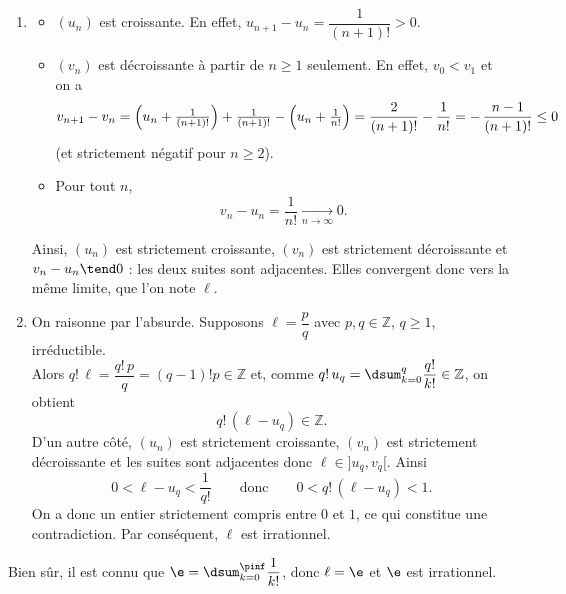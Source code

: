 \begin{enumerate}

\item
\begin{itemize}
\item $(u_n)$ est croissante. En effet, $u_{n+1}-u_n=\dfrac{1}{(n+1)!}>0$.
\item $(v_n)$ est décroissante à partir de $n\ge 1$ seulement. En effet, $v_0<v_1$ et on a
\[
v_{n+1}-v_n
= \Bigl(u_n+\tfrac{1}{(n+1)!}\Bigr) + \tfrac{1}{(n+1)!} - \Bigl(u_n+\tfrac{1}{n!}\Bigr)
= \frac{2}{(n+1)!}-\frac{1}{n!}
= -\,\frac{n-1}{(n+1)!}\le 0
\]
(et strictement négatif pour $n\ge 2$).
\item Pour tout $n$,
\[
v_n-u_n=\frac{1}{n!}\xrightarrow[n\to\infty]{}0.
\]
\end{itemize}
Ainsi, $(u_n)$ est strictement croissante, $(v_n)$ est strictement décroissante et $v_n-u_n\tend0$ :
les deux suites sont adjacentes. Elles convergent donc vers la même limite, que l’on note $\ell$.

\item
On raisonne par l’absurde. Supposons $\ell=\dfrac{p}{q}$ avec $p,q\in\mathbb{Z}$, $q\ge 1$, irréductible.\\
Alors $q!\,\ell=\dfrac{q!\,p}{q}=(q-1)!p\in\mathbb{Z}$
et, comme $q!\,u_q=\dsum_{k=0}^q\dfrac{q!}{k!}\in\mathbb{Z}$, on obtient
\[
q!\,(\ell-u_q)\in\mathbb{Z}.
\]
D’un autre côté, $(u_n)$ est strictement croissante, $(v_n)$ est strictement décroissante et les suites sont adjacentes donc $\ell\in]u_q,v_q[$. Ainsi
\[
0<\ell-u_q<\frac{1}{q!}\qquad\text{donc}\qquad 0<q!\,(\ell-u_q)<1.
\]
On a donc un entier strictement compris entre $0$ et $1$, ce qui constitue une contradiction. Par conséquent, $\ell$ est irrationnel.
\end{enumerate}
Bien sûr, il est connu que $\e=\dsum_{k=0}^{\pinf}\dfrac1{k!}$, donc $\ell=\e$ et $\e$ est irrationnel.
